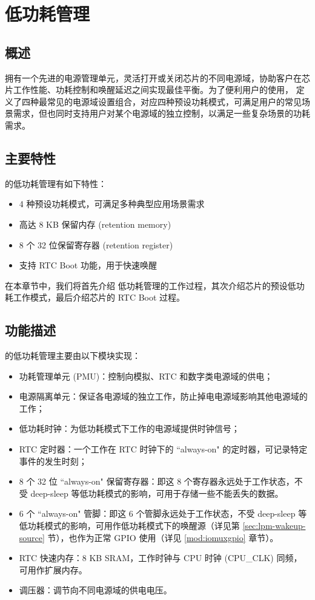 \documentclass[main\_\_CN.tex]{subfiles}
\begin{document}
\hypertarget{lowpowm}{}
\chapter{低功耗管理}\label{mod:lowpowm}

\section{概述}

\chipname{} 拥有一个先进的电源管理单元，灵活打开或关闭芯片的不同电源域，协助客户在芯片工作性能、功耗控制和唤醒延迟之间实现最佳平衡。为了便利用户的使用，\chipname{}  定义了四种最常见的电源域设置组合，对应四种预设功耗模式，可满足用户的常见场景需求，但也同时支持用户对某个电源域的独立控制，以满足一些复杂场景的功耗需求。

\section{主要特性}
\chipname{} 的低功耗管理有如下特性：
\begin{itemize}
\item 4 种预设功耗模式，可满足多种典型应用场景需求
\item 高达 8 KB 保留内存 (retention memory)
\item 8 个 32 位保留寄存器 (retention register)
\item 支持 RTC Boot 功能，用于快速唤醒
\end{itemize}

在本章节中，我们将首先介绍 \chipname{}  低功耗管理的工作过程，其次介绍芯片的预设低功耗工作模式，最后介绍芯片的 RTC Boot 过程。

\section{功能描述}

\chipname{} 的低功耗管理主要由以下模块实现：
\begin{itemize}
\item 功耗管理单元 (PMU)：控制向模拟、RTC 和数字类电源域的供电；
\item 电源隔离单元：保证各电源域的独立工作，防止掉电电源域影响其他电源域的工作；
\item 低功耗时钟：为低功耗模式下工作的电源域提供时钟信号；
\item RTC 定时器：一个工作在 RTC 时钟下的 ``always-on" 的定时器，可记录特定事件的发生时刻；
\item 8 个 32 位 ``always-on" 保留寄存器：即这 8 个寄存器永远处于工作状态，不受 deep-sleep 等低功耗模式的影响，可用于存储一些不能丢失的数据。
\item 6 个 ``always-on" 管脚：即这 6 个管脚永远处于工作状态，不受 deep-sleep 等低功耗模式的影响，可用作低功耗模式下的唤醒源（详见第 \ref{sec:lpm-wakeup-source} 节），也作为正常 GPIO 使用（详见 \ref{mod:iomuxgpio} \textit{} 章节）。
\item RTC 快速内存：8 KB SRAM，工作时钟与 CPU 时钟 (CPU\_CLK) 同频，可用作扩展内存。
\item 调压器：调节向不同电源域的供电电压。
\end{itemize}
\end{document}
